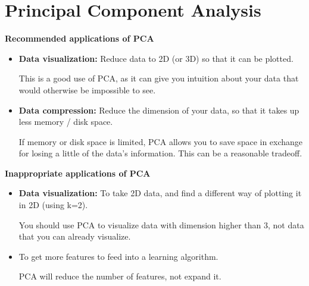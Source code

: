 \documentclass[]{article}
\begin{document}
\section{Principal Component Analysis}

\textbf{Recommended applications of PCA}
\begin{itemize}
\item \textbf{Data visualization:} Reduce data to 2D (or 3D) so that it can be plotted.

This is a good use of PCA, as it can give you intuition about your data that would otherwise be impossible to see.

\item \textbf{Data compression:} Reduce the dimension of your data, so that it takes up less memory / disk space.  

If memory or disk space is limited, PCA allows you to save space in exchange for losing a little of the data's information. This can be a reasonable tradeoff.
\end{itemize}
\textbf{Inappropriate applications of PCA}
\begin{itemize}
\item \textbf{Data visualization:} To take 2D data, and find a different way of plotting it in 2D (using k=2).
		
 
 You should use PCA to visualize data with dimension higher than 3, not data that you can already visualize.
\item To get more features to feed into a learning algorithm.	 

	PCA will reduce the number of features, not expand it.
\end{itemize}
\end{document}
